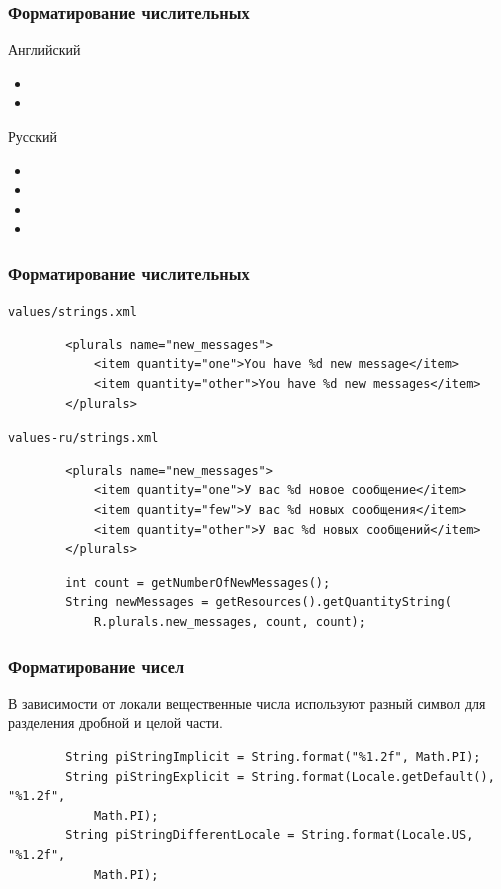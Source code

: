 \documentclass{beamer}
\begin{document}
\begin{frame}
    \frametitle{Форматирование числительных}
    \begin{block}{Английский}
        \begin{itemize}
            \item {}
            \item {}
        \end{itemize}
    \end{block}
    \begin{block}{Русский}
        \begin{itemize}
            \item {}
            \item {}
            \item {}
            \item {}
        \end{itemize}
    \end{block}
\end{frame}

\begin{frame}[fragile]
    \frametitle{Форматирование числительных}
    \texttt{\footnotesize values/strings.xml}
    \begin{verbatim}
        <plurals name="new_messages">
            <item quantity="one">You have %d new message</item>
            <item quantity="other">You have %d new messages</item>
        </plurals>
    \end{verbatim}
    \texttt{\footnotesize values-ru/strings.xml}
    \begin{verbatim}
        <plurals name="new_messages">
            <item quantity="one">У вас %d новое сообщение</item>
            <item quantity="few">У вас %d новых сообщения</item>
            <item quantity="other">У вас %d новых сообщений</item>
        </plurals>
    \end{verbatim}
    \begin{verbatim}
        int count = getNumberOfNewMessages();
        String newMessages = getResources().getQuantityString(
            R.plurals.new_messages, count, count);
    \end{verbatim}
\end{frame}

\begin{frame}[fragile]
    \frametitle{Форматирование чисел}
    В зависимости от локали вещественные числа используют разный символ для
    разделения дробной и целой части.
    \begin{verbatim}
        String piStringImplicit = String.format("%1.2f", Math.PI);
        String piStringExplicit = String.format(Locale.getDefault(), "%1.2f",
            Math.PI);
        String piStringDifferentLocale = String.format(Locale.US, "%1.2f",
            Math.PI);
    \end{verbatim}
\end{frame}
\end{document}

